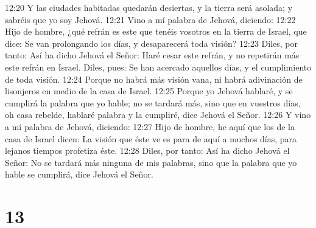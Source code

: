 12:20 Y las ciudades habitadas quedarán desiertas, y la tierra será asolada; y sabréis que yo soy Jehová.  
12:21 Vino a mí palabra de Jehová, diciendo:  
12:22 Hijo de hombre, ¿qué refrán es este que tenéis vosotros en la tierra de Israel, que dice: Se van prolongando los días, y desaparecerá toda visión?  
12:23 Diles, por tanto: Así ha dicho Jehová el Señor: Haré cesar este refrán, y no repetirán más este refrán en Israel. Diles, pues: Se han acercado aquellos días, y el cumplimiento de toda visión.  
12:24 Porque no habrá más visión vana, ni habrá adivinación de lisonjeros en medio de la casa de Israel.  
12:25 Porque yo Jehová hablaré, y se cumplirá la palabra que yo hable; no se tardará más, sino que en vuestros días, oh casa rebelde, hablaré palabra y la cumpliré, dice Jehová el Señor.  
12:26 Y vino a mí palabra de Jehová, diciendo:  
12:27 Hijo de hombre, he aquí que los de la casa de Israel dicen: La visión que éste ve es para de aquí a muchos días, para lejanos tiempos profetiza éste.  
12:28 Diles, por tanto: Así ha dicho Jehová el Señor: No se tardará más ninguna de mis palabras, sino que la palabra que yo hable se cumplirá, dice Jehová el Señor.  

\chapter{13}

